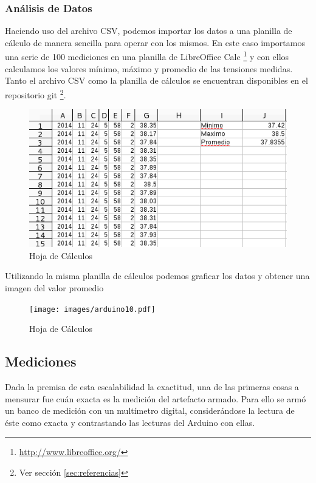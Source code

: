 \documentclass[12pt,a4paper]{article}
\begin{document}
			\subsubsection{Análisis de Datos}
				Haciendo uso del archivo CSV, podemos importar los datos a una planilla de cálculo de manera sencilla para operar con los mismos. En este caso importamos una serie de 100 mediciones en una planilla de LibreOffice Calc \footnote{\url{http://www.libreoffice.org/}} y con ellos calculamos los valores mínimo, máximo y promedio de las tensiones medidas. Tanto el archivo CSV como la planilla de cálculos se encuentran disponibles en el repositorio git \footnote{Ver sección \ref{sec:referencias}}.

				\begin{figure}[H]
					\centering
					\includegraphics[scale=1]{images/arduino9.png}\caption{Hoja de Cálculos}
					\end{figure}

				Utilizando la misma planilla de cálculos podemos graficar los datos y obtener una imagen del valor promedio

				\begin{figure}[H]
					\centering
					\texttt{[image: images/arduino10.pdf]}\caption{Hoja de Cálculos}
					\end{figure}


		\subsection{Mediciones}

			Dada la premisa de esta escalabilidad la exactitud, una de las primeras cosas a mensurar fue cuán exacta es la medición del artefacto armado. Para ello se armó un banco de medición con un multímetro digital, considerándose la lectura de éste como exacta y contrastando las lecturas del Arduino con ellas.
\end{document}
